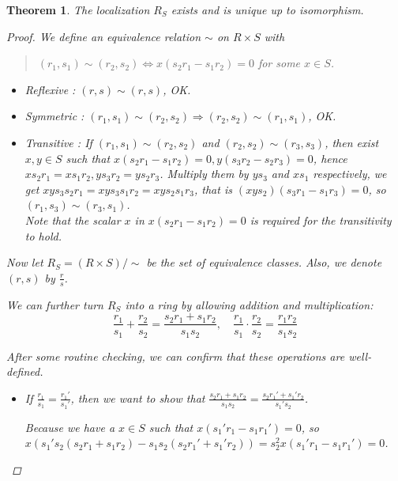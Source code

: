 \documentclass[a4paper]{article}
\theoremstyle{mystyle}
\newtheorem{theorem}{Theorem}
\begin{document}
\begin{theorem}
  The localization $R_S$ exists and is unique up to isomorphism.
  \begin{proof}
    We define an equivalence relation $\sim$ on $R \times S$ with
    \begin{quote}
      $(r_1, s_1) \sim (r_2, s_2) \Longleftrightarrow x(s_2r_1- s_1r_2) = 0$ for some $x \in S$.
    \end{quote}

    \begin{itemize}
      \itemsep=-1.5pt
      \item Reflexive : $(r, s) \sim (r, s)$, OK.
      \item Symmetric : $(r_1, s_1) \sim (r_2, s_2) \Longrightarrow (r_2, s_2) \sim (r_1, s_1)$, OK.
      \item Transitive :
        If $(r_1, s_1) \sim (r_2, s_2)$ and $(r_2, s_2) \sim (r_3, s_3)$, then exist $x, y \in S$ such that
        $x(s_2r_1 - s_1r_2) = 0, y(s_3r_2 - s_2r_3) = 0$, hence $xs_2r_1 = xs_1r_2, ys_3r_2 = ys_2r_3$.
        Multiply them by $ys_3$ and $xs_1$ respectively, we get
        $xys_3s_2r_1 = xys_3s_1r_2 = xys_2s_1r_3$, that is $(xys_2)(s_3r_1-s_1r_3) = 0$, so 
        $(r_1, s_3) \sim (r_3, s_1)$.\\

        Note that the scalar $x$ in $x(s_2r_1 - s_1r_2)=0$ is required for the transitivity to hold.
    \end{itemize}

    Now let $R_S = (R \times S)/\sim$ be the set of equivalence classes. Also, we denote 
    $(r, s)$ by $\frac{r}{s}$.

    We can further turn $R_S$ into a ring by allowing addition and multiplication:
    $$\frac{r_1}{s_1} + \frac{r_2}{s_2} = \frac{s_2r_1 + s_1r_2}{s_1s_2},\quad
    \frac{r_1}{s_1} \cdot \frac{r_2}{s_2} = \frac{r_1r_2}{s_1s_2}$$

    After some routine checking, we can confirm that these operations are well-defined.
    \begin{itemize}
      \item
        If $\frac{r_1}{s_1} = \frac{r_1'}{s_1'}$, then we want to show that
        $\frac{s_2r_1 + s_1r_2}{s_1s_2} = \frac{s_2r_1' + s_1'r_2}{s_1's_2}$.
        
        Because we have a $x \in S$ such that $x(s_1'r_1 - s_1r_1') = 0$, so 
        $x(s_1's_2(s_2r_1+s_1r_2)-s_1s_2(s_2r_1'+s_1'r_2)) = s_2^2 x(s_1'r_1 - s_1r_1') = 0$.


\end{itemize}
\end{proof}
\end{theorem}
\end{document}
